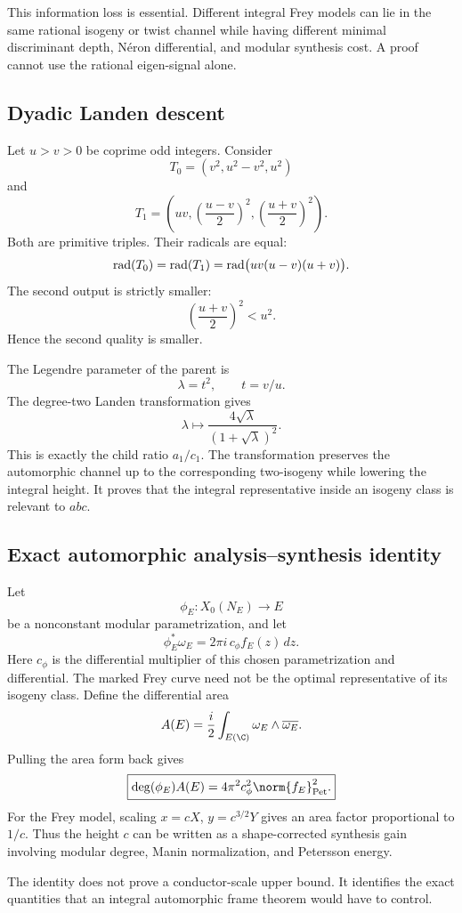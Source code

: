 This information loss is essential. Different integral Frey models can lie in the same rational isogeny or twist channel while having different minimal discriminant depth, N\'eron differential, and modular synthesis cost. A proof cannot use the rational eigen-signal alone.

\subsection{Dyadic Landen descent}
Let $u>v>0$ be coprime odd integers. Consider
\[
 T_0=(v^2,u^2-v^2,u^2)
\]
and
\[
 T_1=
 \left(
 uv,
 \left(\frac{u-v}{2}\right)^2,
 \left(\frac{u+v}{2}\right)^2
 \right).
\]
Both are primitive triples. Their radicals are equal:
\[
 \operatorname{rad}(T_0)=\operatorname{rad}(T_1)=\operatorname{rad}\bigl(uv(u-v)(u+v)\bigr).
\]
The second output is strictly smaller:
\[
 \left(\frac{u+v}{2}\right)^2<u^2.
\]
Hence the second quality is smaller.

The Legendre parameter of the parent is
\[
 \lambda=t^2,
 \qquad
 t=v/u.
\]
The degree-two Landen transformation gives
\[
 \boxed{
 \lambda
 \longmapsto
 \frac{4\sqrt\lambda}{(1+\sqrt\lambda)^2}.
 }
\]
This is exactly the child ratio $a_1/c_1$. The transformation preserves the automorphic channel up to the corresponding two-isogeny while lowering the integral height. It proves that the integral representative inside an isogeny class is relevant to $abc$.

\subsection{Exact automorphic analysis--synthesis identity}
Let
\[
 \phi_E:X_0(N_E)\longrightarrow E
\]
be a nonconstant modular parametrization, and let
\[
 \phi_E^*\omega_E
 =
 2\pi i\,c_\phi f_E(z)\,dz.
\]
Here $c_\phi$ is the differential multiplier of this chosen parametrization and differential. The marked Frey curve need not be the optimal representative of its isogeny class. Define the differential area
\[
 A(E)
 =
 \frac{i}{2}
 \int_{E(\C)}
 \omega_E\wedge\overline{\omega_E}.
\]
Pulling the area form back gives
\[
 \boxed{
 \deg(\phi_E)A(E)
 =
 4\pi^2 c_\phi^2
 \norm{f_E}_{\mathrm{Pet}}^2.
 }
\]
For the Frey model, scaling $x=cX$, $y=c^{3/2}Y$ gives an area factor proportional to $1/c$. Thus the height $c$ can be written as a shape-corrected synthesis gain involving modular degree, Manin normalization, and Petersson energy.

The identity does not prove a conductor-scale upper bound. It identifies the exact quantities that an integral automorphic frame theorem would have to control.


